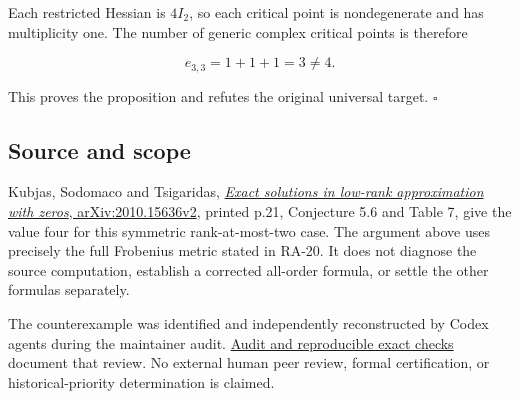 \documentclass[10pt,a4paper]{article}
\begin{document}
Each restricted Hessian is \(4I_2\), so each critical point is
nondegenerate and has multiplicity one. The number of generic complex
critical points is therefore

\[e_{3,3}=1+1+1=3\ne4.\]

This proves the proposition and refutes the original universal target.
\(\square\)

\subsection{Source and scope}\label{source-and-scope}

Kubjas, Sodomaco and Tsigaridas,
\href{https://arxiv.org/pdf/2010.15636v2}{\emph{Exact solutions in
low-rank approximation with zeros}, arXiv:2010.15636v2}, printed p.21,
Conjecture 5.6 and Table 7, give the value four for this symmetric
rank-at-most-two case. The argument above uses precisely the full
Frobenius metric stated in RA-20. It does not diagnose the source
computation, establish a corrected all-order formula, or settle the
other formulas separately.

The counterexample was identified and independently reconstructed by
Codex agents during the maintainer audit.
\href{https://github.com/ajt60gaibb/OpenProblemsInNLA/blob/main/references/research-expansion-2026-09-11/ra20-resolution/README.md}{Audit
and reproducible exact checks} document that review. No external human
peer review, formal certification, or historical-priority determination
is claimed.
\end{document}
